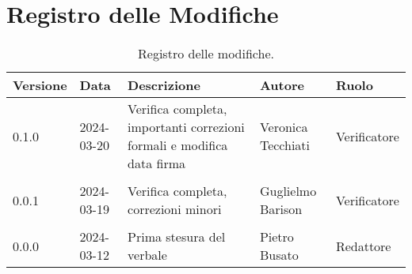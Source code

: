 \section*{Registro delle Modifiche}
\begin{table}[ht!]	
		\centering
		\begin{tabular}{p{1.2cm} p{2cm} p{6cm} p{3cm} p{2cm}}
			\toprule
			\textbf{Versione}& \textbf{Data} & \textbf{Descrizione} & \textbf{Autore} & \textbf{Ruolo} \\
			\midrule
			0.1.0 & 2024-03-20 & Verifica completa, importanti correzioni formali e modifica data firma & Veronica Tecchiati & Verificatore \\\\
			0.0.1 & 2024-03-19 & Verifica completa, correzioni minori & Guglielmo Barison & Verificatore \\\\
			0.0.0 & 2024-03-12 & Prima stesura del verbale & Pietro Busato & Redattore \\
			\bottomrule
		\end{tabular}
		\caption{Registro delle modifiche.}
		\label{table:Registro delle modifiche}
\end{table}